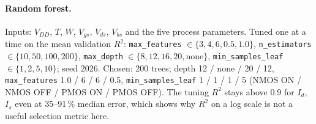 \documentclass[11pt,a4paper]{article}
\begin{document}
\paragraph{Random forest.} Inputs: $V_{DD}$, $T$, $W$, $V_{gs}$, $V_{ds}$, $V_{bs}$ and the five process
parameters. Tuned one at a time on the mean validation $R^2$: \texttt{max\_features} $\in\{3, 4, 6, 0.5, 1.0\}$,
\texttt{n\_estimators} $\in\{10, 50, 100, 200\}$, \texttt{max\_depth} $\in\{8, 12, 16, 20, \text{none}\}$,
\texttt{min\_samples\_leaf} $\in\{1, 2, 5, 10\}$; seed 2026. Chosen: 200 trees; depth 12 / none / 20 / 12,
\texttt{max\_features} 1.0 / 6 / 6 / 0.5, \texttt{min\_samples\_leaf} 1 / 1 / 1 / 5 (NMOS ON / NMOS OFF /
PMOS ON / PMOS OFF). The tuning $R^2$ stays above 0.9 for $I_d$, $I_s$ even at 35--91\,\% median error,
which shows why $R^2$ on a log scale is not a useful selection metric here.
\end{document}

